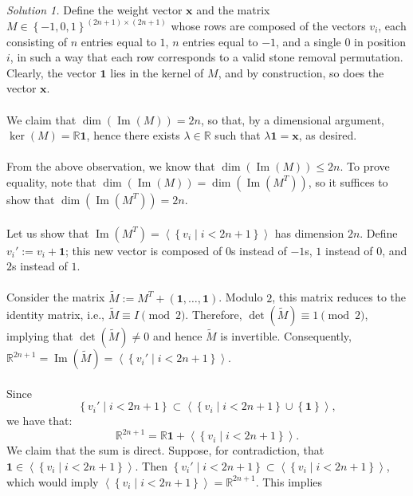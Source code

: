 \documentclass[11pt, a4paper, oneside]{article}
\theoremstyle{remark}
\theoremstyle{lemma}
\begin{document}
\textit{Solution 1.} Define the weight vector $\mathbf{x}$ and the matrix \( M \in \left\{-1, 0, 1\right\}^{(2n+1) \times (2n+1)} \) whose rows are composed of the vectors \( v_i \), each consisting of \( n \) entries equal to \( 1 \), \( n \) entries equal to \( -1 \), and a single \( 0 \) in position \( i \), in such a way that each row corresponds to a valid stone removal permutation. Clearly, the vector \( \mathbf{1} \) lies in the kernel of \( M \), and by construction, so does the vector \( \mathbf{x} \).
\\\\
We claim that \( \dim\left(\operatorname{Im}(M)\right) = 2n \), so that, by a dimensional argument, \( \ker(M) = \mathbb{R} \mathbf{1} \), hence there exists \( \lambda \in \mathbb{R} \) such that \( \lambda \mathbf{1} = \mathbf{x} \), as desired.
\\\\
From the above observation, we know that \( \dim\left(\operatorname{Im}(M)\right) \leq 2n \). To prove equality, note that \( \dim\left(\operatorname{Im}(M)\right) = \dim\left(\operatorname{Im}\left(M^T\right)\right) \), so it suffices to show that \( \dim\left(\operatorname{Im}\left(M^T\right)\right) = 2n \).
\\\\
Let us show that \( \operatorname{Im}\left(M^T\right) = \left\langle \left\{ v_i \mid i < 2n+1 \right\} \right\rangle \) has dimension \( 2n \). Define \( v_i' := v_i + \mathbf{1} \); this new vector is composed of \( 0 \)s instead of \( -1 \)s, \( 1 \) instead of \( 0 \), and \( 2 \)s instead of \( 1 \).
\\\\
Consider the matrix \( \tilde{M} := M^T + \left( \mathbf{1}, \ldots, \mathbf{1} \right) \). Modulo \( 2 \), this matrix reduces to the identity matrix, i.e., \( \tilde{M} \equiv I \pmod{2} \). Therefore, \( \det\left(\tilde{M}\right) \equiv 1 \pmod{2} \), implying that \( \det\left(\tilde{M}\right) \neq 0 \) and hence \( \tilde{M} \) is invertible. Consequently, \( \mathbb{R}^{2n+1} = \operatorname{Im}\left(\tilde{M}\right) = \left\langle \left\{ v_i' \mid i < 2n+1 \right\} \right\rangle \).
\\\\
Since
\[
\left\{ v_i' \mid i < 2n+1 \right\} \subset \left\langle \left\{ v_i \mid i < 2n+1 \right\} \cup \left\{ \mathbf{1} \right\} \right\rangle,
\]
we have that:
\[
\mathbb{R}^{2n+1} = \mathbb{R} \mathbf{1} + \left\langle \left\{ v_i \mid i < 2n+1 \right\} \right\rangle.
\]
We claim that the sum is direct. Suppose, for contradiction, that \( \mathbf{1} \in \left\langle \left\{ v_i \mid i < 2n+1 \right\} \right\rangle \). Then \( \left\{ v_i' \mid i < 2n+1 \right\} \subset \left\langle \left\{ v_i \mid i < 2n+1 \right\} \right\rangle \), which would imply \( \left\langle \left\{ v_i \mid i < 2n+1 \right\} \right\rangle = \mathbb{R}^{2n+1} \). This implies
\end{document}

